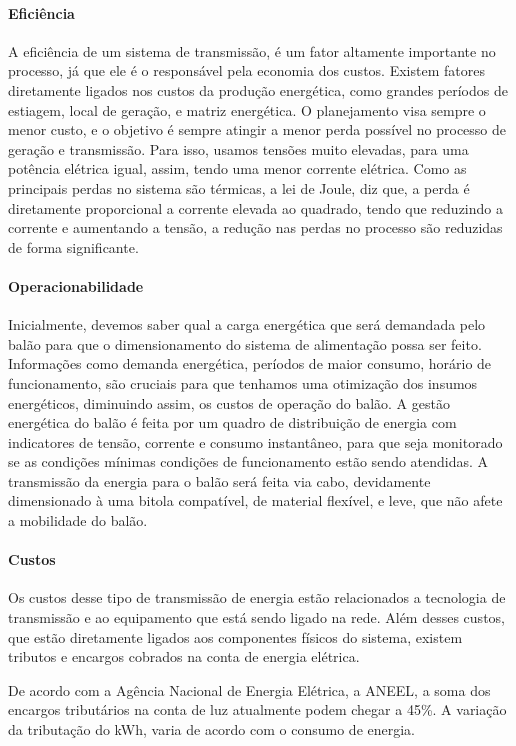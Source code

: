     \paragraph{Eficiência}
    A eficiência de um sistema de transmissão, é um fator altamente importante no processo, já que ele é o responsável pela economia dos custos. Existem fatores diretamente ligados nos custos da produção energética, como grandes períodos de estiagem, local de geração, e matriz energética. O planejamento visa sempre o menor custo, e o objetivo é sempre atingir a menor perda possível no processo de geração e transmissão.  Para isso, usamos tensões muito elevadas,  para uma potência elétrica igual, assim, tendo uma menor corrente elétrica. Como as principais perdas no sistema são térmicas, a lei de Joule, diz que, a perda é diretamente proporcional a corrente elevada ao quadrado, tendo que reduzindo a corrente e aumentando a tensão, a redução nas perdas no processo são reduzidas de forma significante.
    
    \paragraph{Operacionabilidade}
    Inicialmente, devemos saber qual a carga energética que será demandada pelo balão para que o dimensionamento do sistema de alimentação possa ser feito. Informações como demanda energética, períodos de maior consumo, horário de funcionamento, são cruciais para que tenhamos uma otimização dos insumos energéticos, diminuindo assim, os custos de operação do balão. A gestão energética do balão é feita por um quadro de distribuição de energia com indicatores de tensão, corrente e consumo instantâneo, para que seja monitorado se as condições mínimas condições de funcionamento estão sendo atendidas. A transmissão da energia para o balão será feita via cabo, devidamente dimensionado à uma bitola compatível, de material flexível, e leve, que não afete a mobilidade do balão.

    \paragraph{Custos}
    Os custos desse tipo de transmissão de energia estão relacionados a tecnologia de transmissão e ao equipamento que está sendo ligado na rede. Além desses custos, que estão diretamente ligados aos componentes físicos do sistema, existem tributos e encargos cobrados na conta de energia elétrica.
    
    De acordo com a Agência Nacional de Energia Elétrica, a ANEEL, a soma dos encargos tributários na conta de luz atualmente podem chegar a 45\%. A variação da tributação do kWh, varia de acordo com o consumo de energia.
    
